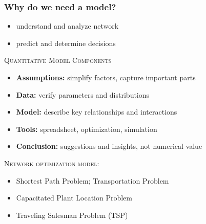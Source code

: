 \documentclass[10pt,handout,notes=show]{beamer}
\begin{document}
\begin{frame}
  \frametitle{Why do we need a model?}
  \begin{itemize}
    \item understand and analyze network
    \item predict and determine decisions
  \end{itemize}

  \NextHalfLine
  \textsc{Quantitative Model Components}
  \begin{itemize}
    \item \textbf{Assumptions:} \alert{simplify factors}, capture important parts
    \item \textbf{Data:} verify parameters and distributions
    \item \textbf{Model:} describe key \alert{relationships} and interactions
    \item \textbf{Tools:} spreadsheet, optimization, simulation
    \item \textbf{Conclusion:} suggestions and \alert{insights}, not numerical value
  \end{itemize}

  \NextHalfLine
  \textsc{Network optimization model:} 
  \begin{itemize}
      \item<2-> Shortest Path Problem; Transportation Problem
      \item<2-> Capacitated Plant Location Problem
      \item<2-> Traveling Salesman Problem (TSP)
  \end{itemize}


 \end{frame}

\end{document}
